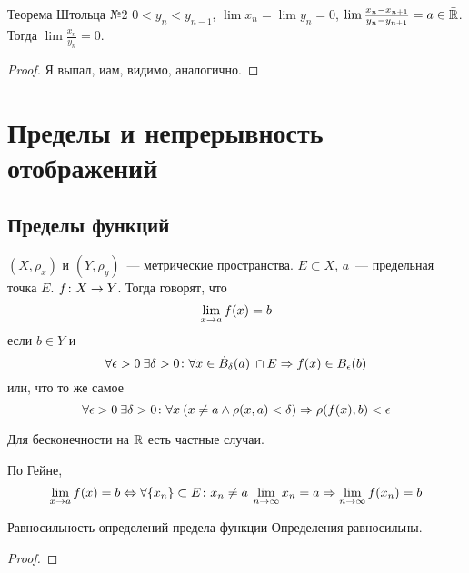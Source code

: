 \begin{theorem}{Теорема Штольца №2}
$0<y_n<y_{n-1}$, $\lim x_n = \lim y_n = 0$, $\lim \frac{x_n-x_{n+1}}{y_n-y_{n+1}} = a \in \bar{\mathbb{R}}$.
Тогда $\lim \frac{x_n}{y_n} = 0$.
\end{theorem}
\begin{proof}
Я выпал, иам, видимо, аналогично.
\end{proof}

\chapter{Пределы и непрерывность отображений}
\section{Пределы функций}

\begin{Def}
$(X, \rho_x)$ и $(Y, \rho_y)$~--- метрические пространства. $E \subset X$, $a$~--- предельная точка $E$. $f\colon X \rightarrow Y$.
Тогда говорят, что
$$\lim_{x \rightarrow a} f(x) = b$$
если $b \in Y$ и
$$\forall \epsilon>0\: \exists \delta > 0\colon \forall x \in \dot B_\delta(a)\: \cap E \Rightarrow f(x) \in B_\epsilon (b)$$
или, что то же самое
$$\forall \epsilon>0\: \exists \delta > 0\colon \forall x\: (x \ne a \land \rho(x, a) < \delta) \Rightarrow \rho(f(x), b) < \epsilon$$
\end{Def}

\begin{Rem}
Для бесконечности на $\mathbb{R}$ есть частные случаи.
\end{Rem}

\begin{Def}
По Гейне,
$$\lim_{x \rightarrow a} f(x) = b \Leftrightarrow \forall \{x_n\}\subset E\colon x_n \ne a\: \lim_{n\rightarrow \infty} x_n = a \Rightarrow \lim_{n \rightarrow \infty} f(x_n) = b$$
\end{Def}

\begin{theorem}{Равносильность определений предела функции}
Определения равносильны.
\end{theorem}
\begin{proof}

\end{proof}